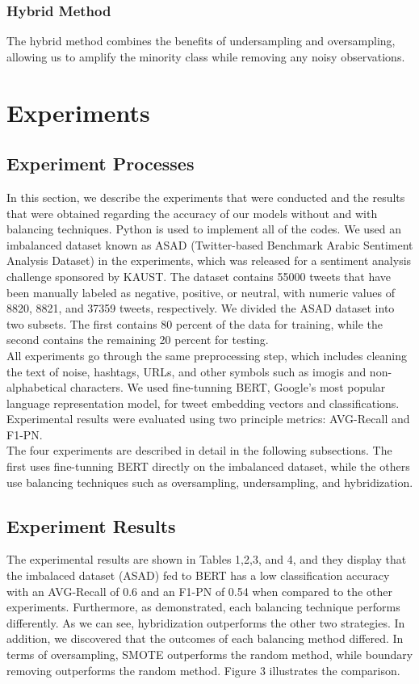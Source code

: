 \documentclass[conference]{IEEEtran}
\begin{document}
	\subsubsection{Hybrid Method}	
	The hybrid method combines the benefits of undersampling and oversampling, allowing us to amplify the minority class while removing any noisy observations. 
	
	\section{Experiments}
	\subsection{Experiment Processes}
In this section, we describe the experiments that were conducted and the results that were obtained regarding the accuracy of our models without and with balancing techniques.
Python is used to implement all of the codes.
We used an imbalanced dataset known as ASAD (Twitter-based Benchmark Arabic Sentiment Analysis Dataset) in the experiments, which was released for a sentiment analysis challenge sponsored by KAUST.
The dataset contains 55000 tweets that have been manually labeled as negative, positive, or neutral, with numeric values of 8820, 8821, and 37359 tweets, respectively. We divided the ASAD dataset into two subsets. The first contains 80 percent of the data for training, while the second contains the remaining 20 percent for testing.\\
 
All experiments go through the same preprocessing step, which includes cleaning the text of noise, hashtags, URLs, and other symbols such as imogis and non-alphabetical characters. 
We used fine-tunning BERT, Google's most popular language representation model, for tweet embedding vectors and classifications. 
Experimental results were evaluated using two principle metrics: AVG-Recall and F1-PN.\\

The four experiments are described in detail in the following subsections.
The first uses fine-tunning BERT directly on the imbalanced dataset, while the others use balancing techniques such as oversampling, undersampling, and hybridization.   \\

\subsection{Experiment Results}
The experimental results are shown in Tables 1,2,3, and 4, and they display that the imbalaced dataset (ASAD) fed to BERT has a low classification accuracy with an AVG-Recall of 0.6 and an F1-PN of 0.54 when compared to the other experiments. Furthermore, as demonstrated, each balancing technique performs differently. As we can see, hybridization outperforms the other two strategies. In addition, we discovered that the outcomes of each balancing method differed. In terms of oversampling, SMOTE outperforms the random method, while boundary removing outperforms the random method. Figure 3 illustrates the comparison. 
\end{document}
